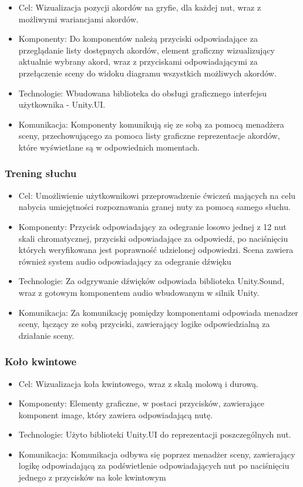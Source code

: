 \begin{itemize}
\item Cel: Wizualizacja pozycji akordów na gryfie, dla każdej nut, wraz z możliwymi wariancjami akordów.
\item Komponenty: Do komponentów należą przyciski odpowiadające za przeglądanie listy dostępnych akordów, element graficzny wizualizujący aktualnie wybrany akord, wraz z przyciskami odpowiadającymi za przełączenie sceny do widoku diagramu wszystkich możliwych akordów.
\item Technologie: Wbudowana biblioteka do obsługi graficznego interfejsu użytkownika - Unity.UI.
\item Komunikacja: Komponenty komunikują się ze sobą za pomocą menadżera sceny, przechowującego za pomoca listy graficzne reprezentacje akordów, które wyświetlane są w odpowiednich momentach. 
\end{itemize}

\subsubsection{Trening słuchu}

\begin{itemize}
\item Cel: Umożliwienie użytkownikowi przeprowadzenie ćwiczeń mających na celu nabycia umiejętności rozpoznawania granej nuty za pomocą samego słuchu.
\item Komponenty: Przycisk odpowiadający za odegranie losowo jednej z 12 nut skali chromatycznej, przyciski odpowiadające za odpowiedź, po naciśnięciu których weryfikowana jest poprawność udzielonej odpowiedzi. Scena zawiera również system audio odpowiadający za odegranie dźwięku
\item Technologie: Za odgrywanie dźwięków odpowiada biblioteka Unity.Sound, wraz z gotowym komponentem audio wbudowanym w silnik Unity.
\item Komunikacja: Za komunikację pomiędzy komponentami odpowiada menadzer sceny, łączący ze sobą przyciski, zawierający logike odpowiedzialną za działanie sceny.
\end{itemize}

\subsubsection{Koło kwintowe}

\begin{itemize}
	\item Cel: Wizualizacja koła kwintowego, wraz z skalą molową i durową.
	\item Komponenty: Elementy graficzne, w postaci przycisków, zawierające komponent image, który zawiera odpowiadającą nutę.
	\item Technologie: Użyto biblioteki Unity.UI do reprezentacji poszczególnych nut.
	\item Komunikacja: Komunikacja odbywa się poprzez menadżer sceny, zawierający logikę odpowiadającą za podświetlenie odpowiadających nut po naciśnięciu jednego z przycisków na kole kwintowym
\end{itemize}